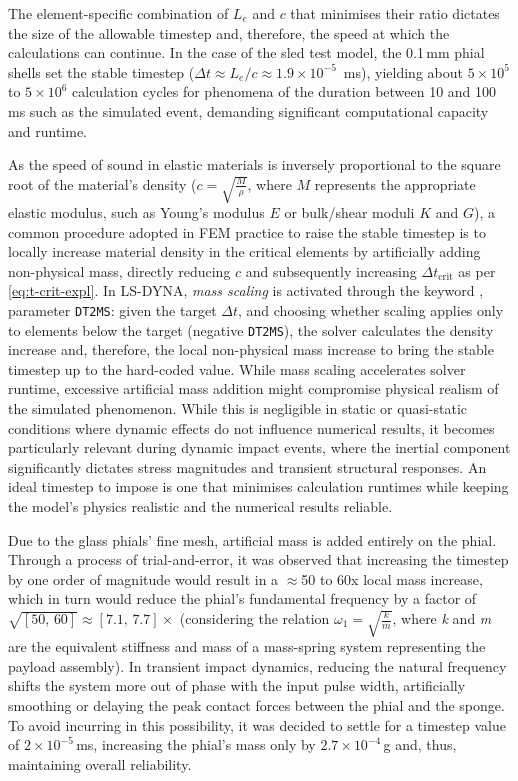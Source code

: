 The element-specific combination of $L_e$ and $c$ that minimises their ratio dictates the size of the allowable timestep and, therefore, the speed at which the calculations can continue. In the case of the sled test model, the 0.1\,mm phial shells set the stable timestep ($\Delta t \approx L_e/c \approx 1.9\times10^{-5}$~ms), yielding about $5\times10^5$ to $5\times10^6$ calculation cycles for phenomena of the duration between 10 and 100\,ms such as the simulated event, demanding significant computational capacity and runtime.

As the speed of sound in elastic materials is inversely proportional to the square root of the material's density ($c = \sqrt{\frac{M}{\rho}}$, where $M$ represents the appropriate elastic modulus, such as Young's modulus $E$ or bulk/shear moduli $K$ and $G$), a common procedure adopted in FEM practice to raise the stable timestep is to locally increase material density in the critical elements by artificially adding non-physical mass, directly reducing $c$ and subsequently increasing $\Delta t_{\text{crit}}$ as per \cref{eq:t-crit-expl}. In LS-DYNA, \textit{mass scaling} is activated through the keyword , parameter \texttt{DT2MS}: given the target $\Delta t$, and choosing whether scaling applies only to elements below the target (negative \texttt{DT2MS}), the solver calculates the density increase and, therefore, the local non-physical mass increase to bring the stable timestep up to the hard-coded value. While mass scaling accelerates solver runtime, excessive artificial mass addition might compromise physical realism of the simulated phenomenon. While this is negligible in static or quasi-static conditions where dynamic effects do not influence numerical results, it becomes particularly relevant during dynamic impact events, where the inertial component significantly dictates stress magnitudes and transient structural responses. An ideal timestep to impose is one that minimises calculation runtimes while keeping the model's physics realistic and the numerical results reliable.

Due to the glass phials' fine mesh, artificial mass is added entirely on the phial. Through a process of trial-and-error, it was observed that increasing the timestep by one order of magnitude would result in a $\approx$50 to 60x local mass increase, which in turn would reduce the phial's fundamental frequency by a factor of $\sqrt{[50,\,60]} \approx [7.1,\,7.7]\times$ (considering the relation $\omega_1 = \sqrt{\frac{k}{m}}$, where \textit{k} and \textit{m} are the equivalent stiffness and mass of a mass-spring system representing the payload assembly). In transient impact dynamics, reducing the natural frequency shifts the system more out of phase with the input pulse width, artificially smoothing or delaying the peak contact forces between the phial and the sponge. To avoid incurring in this possibility, it was decided to settle for a timestep value of $2\times10^{-5}$\,ms, increasing the phial's mass only by $2.7\times10^{-4}$\,g and, thus, maintaining overall reliability.


